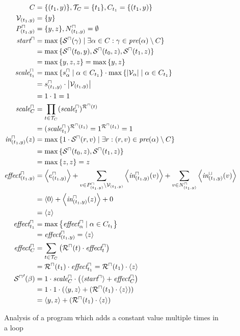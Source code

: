 \begin{figure}
\begin{align*}
  C &= \lbrace (t_1,y) \rbrace, \mathcal{T}_C = \lbrace t_1 \rbrace, C_{t_1} = \lbrace (t_1,y) \rbrace \\
  \mathcal{V}_{(t_1,y)} &= \lbrace y \rbrace \\
  P^\sqcap_{(t_1,y)} &= \lbrace y,z \rbrace, N^\sqcap_{(t_1,y)} = \emptyset \\
  \emph{start}^\sqcap &= \max \left\lbrace {\mathcal{S}^\sqcap}(\gamma) \mid \exists \alpha \in C: \gamma \in \emph{pre}(\alpha) \setminus C \right\rbrace \\
  &= \max \left\lbrace {\mathcal{S}^\sqcap}(t_0,y), {\mathcal{S}^\sqcap}(t_0,z), {\mathcal{S}^\sqcap}(t_1,z) \right\rbrace \\
  &= \max \left\lbrace y,z,z \right\rbrace = \max \left\lbrace y,z \right\rbrace \\
  \emph{scale}^\sqcap_{t_1} &= \max \left\lbrace s^\sqcap_\alpha \mid \alpha \in C_{t_1} \right\rbrace \cdot \max \left\lbrace \left|\mathcal{V}_\alpha\right| \mid \alpha \in C_{t_1} \right\rbrace \\
  &= s^\sqcap_{(t_1,y)} \cdot \left|\mathcal{V}_{(t_1,y)}\right| \\
  &= 1 \cdot 1 = 1 \\
  \emph{scale}^\sqcap_C &= \prod_{t \in \mathcal{T}_C} (\emph{scale}^\sqcap_t)^{{\mathcal{R}^\sqcap}(t)} \\
  &= (\emph{scale}^\sqcap_{t_1})^{{\mathcal{R}^\sqcap}(t_1)} = 1^{{\mathcal{R}^\sqcap}(t_1)} = 1 \\
  \emph{in}^\sqcap_{(t_1,y)}(z) &= \max \left\lbrace 1 \cdot {\mathcal{S}^\sqcap}(r, v) \mid \exists r: (r, v) \in \emph{pre}(\alpha) \setminus C \right\rbrace \\
  &= \max \left\lbrace {\mathcal{S}^\sqcap}(t_0, z), {\mathcal{S}^\sqcap}(t_1, z) \right\rbrace \\
  &= \max \left\lbrace z,z \right\rbrace = z \\
  \emph{effect}^\sqcap_{(t_1,y)} &= \left\langle e^{\sqcap}_{(t_1,y)} \right\rangle + \sum_{v \in P_{(t_1,y)}^\sqcap \setminus \mathcal{V}_{(t_1,y)}} \left\langle \emph{in}^\sqcap_{(t_1,y)}(v) \right\rangle + \sum_{v \in N_{(t_1,y)}^\sqcap} \left\langle \emph{in}^\sqcup_{(t_1,y)}(v) \right\rangle \\
  &= \left\langle 0 \right\rangle + \left\langle \emph{in}^\sqcap_{(t_1,y)}(z) \right\rangle + 0 \\
  &= \left\langle z \right\rangle \\
  \emph{effect}^\sqcap_{t_1} &= \max \left\lbrace \emph{effect}^\sqcap_\alpha \mid \alpha \in C_{t_1}  \right\rbrace \\
  &= \emph{effect}^\sqcap_{(t_1,y)} = \left\langle z \right\rangle \\
  \emph{effect}^\sqcap_C &= \sum_{t \in \mathcal{T}_C} \left( {\mathcal{R}^\sqcap}(t) \cdot \emph{effect}^\sqcap_t \right) \\
  &= {\mathcal{R}^\sqcap}(t_1) \cdot \emph{effect}^\sqcap_{t_1} = {\mathcal{R}^\sqcap}(t_1) \cdot \left\langle z \right\rangle \\
  {\mathcal{S}^\sqcap}'(\beta) &= 1 \cdot \emph{scale}^\sqcap_C \cdot \left( \left\langle \emph{start}^\sqcap \right\rangle + \emph{effect}^\sqcap_C \right) \\
  &= 1 \cdot 1 \cdot \left( \left\langle y,z \right\rangle + ({\mathcal{R}^\sqcap}(t_1) \cdot \left\langle z \right\rangle) \right) \\
  &= \left\langle y,z \right\rangle + ({\mathcal{R}^\sqcap}(t_1) \cdot \left\langle z \right\rangle)
\end{align*}

\caption{Analysis of a program which adds a constant value multiple times in a loop}
\label{fig:additive_loop}
\end{figure}

